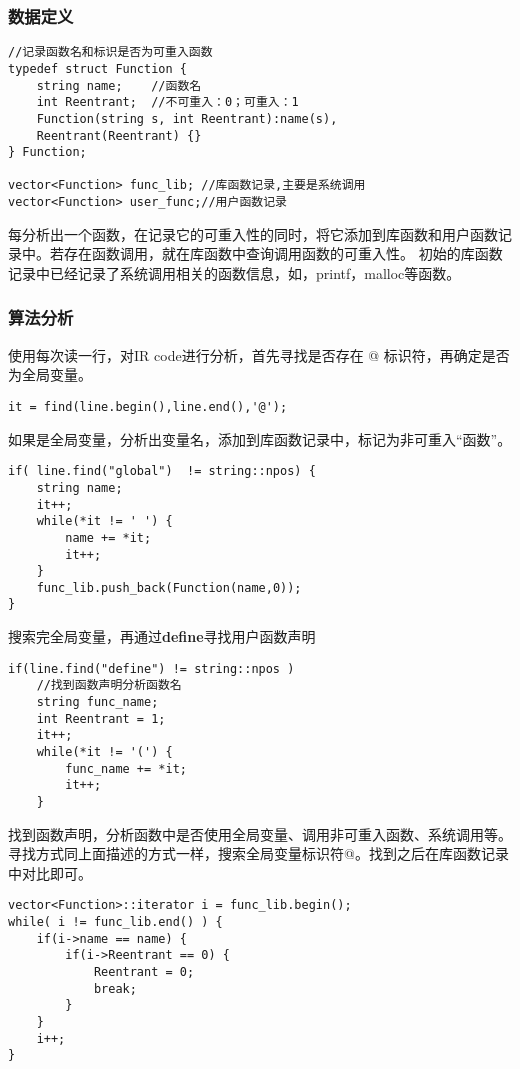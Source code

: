 \documentclass[UTF8]{ctexart}
\begin{document}
\subsubsection{数据定义}
\begin{lstlisting}[frame=shadowbox, rulesepcolor=\color{red!20!green!20!blue!20}] 
//记录函数名和标识是否为可重入函数
typedef struct Function {
    string name;    //函数名
    int Reentrant;  //不可重入：0；可重入：1
    Function(string s, int Reentrant):name(s), 
    Reentrant(Reentrant) {}
} Function;

vector<Function> func_lib; //库函数记录,主要是系统调用
vector<Function> user_func;//用户函数记录
\end{lstlisting}
每分析出一个函数，在记录它的可重入性的同时，将它添加到库函数和用户函数记录中。若存在函数调用，就在库函数中查询调用函数的可重入性。
初始的库函数记录中已经记录了系统调用相关的函数信息，如，printf，malloc等函数。
\newpage
\subsubsection{算法分析}
使用每次读一行，对IR code进行分析，首先寻找是否存在 @ 标识符，再确定是否为全局变量。
\begin{lstlisting}[frame=shadowbox, rulesepcolor=\color{red!20!green!20!blue!20}] 
it = find(line.begin(),line.end(),'@');
\end{lstlisting}
如果是全局变量，分析出变量名，添加到库函数记录中，标记为非可重入“函数”。
\begin{lstlisting}[frame=shadowbox, rulesepcolor=\color{red!20!green!20!blue!20}] 
if( line.find("global")  != string::npos) {
    string name;
    it++;
    while(*it != ' ') {
        name += *it;
        it++;
    }
    func_lib.push_back(Function(name,0));
}
\end{lstlisting}
搜索完全局变量，再通过\textbf{define}寻找用户函数声明
\begin{lstlisting}[frame=shadowbox, rulesepcolor=\color{red!20!green!20!blue!20}] 
    if(line.find("define") != string::npos )
    //找到函数声明分析函数名
    string func_name;
    int Reentrant = 1;
    it++;
    while(*it != '(') {
        func_name += *it;
        it++;
    }
\end{lstlisting}
\newpage
找到函数声明，分析函数中是否使用全局变量、调用非可重入函数、系统调用等。寻找方式同上面描述的方式一样，搜索全局变量标识符@。找到之后在库函数记录中对比即可。
\begin{lstlisting}[frame=shadowbox, rulesepcolor=\color{red!20!green!20!blue!20}] 
vector<Function>::iterator i = func_lib.begin();
while( i != func_lib.end() ) {
    if(i->name == name) {
        if(i->Reentrant == 0) {
            Reentrant = 0;
            break;
        }
    }
    i++;
}
\end{lstlisting}
\end{document}
